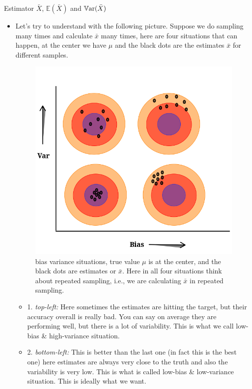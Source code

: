 \documentclass[8pt, usepdftitle=false]{beamer}
\begin{document}
\begin{frame}[allowframebreaks]{Estimator $\bar{X}$, $\mathbb{E}(\bar{X})$ and $\mathbb{V}\mathrm{ar}{(}\bar{X})$}
\begin{itemize}
  \item Let's try to understand with the following picture. Suppose we do sampling many times and calculate $\bar{x}$ many times, here are four situations that can happen, at the center we have $\mu$ and the black dots are the estimates $\bar{x}$ for different samples.


\framebreak

\begin{figure}
\centering
\includegraphics[scale  = .2]{Images/Dart_bias_var.png}
\caption{bias variance situations, true value $\mu$ is at the center, and the black dots are estimates or $\bar{x}$. Here in all four situations think about repeated sampling, i.e., we are calculating $\bar{x}$ in repeated sampling.}
\vspace*{-.4cm}
\end{figure}

\begin{itemize}
\item 1. \emph{top-left:} Here sometimes the estimates are hitting the target, but their accuracy overall is really bad. You can say on average they are performing well, but there is a lot of variability. This is what we call \alert{low-bias \& high-variance} situation.

\item 2. \emph{bottom-left:} This is better than the last one (in fact this is the best one) here estimates are always very close to the truth and also the variability is very low. This is what is called \alert{low-bias \& low-variance} situation. This is ideally what we want.


\end{itemize}
\end{itemize}
\end{frame}
\end{document}
